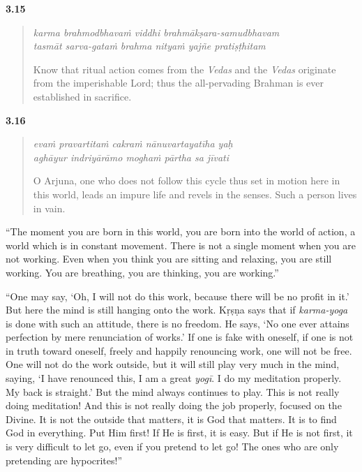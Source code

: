 \par\noindent\textbf{3.15}\par
\begin{verse}
\textit{karma brahmodbhavaṁ viddhi brahmākṣara-samudbhavam} \\
\textit{tasmāt sarva-gataṁ brahma nityaṁ yajñe pratiṣṭhitam}

\noindent Know that ritual action comes from the \textit{Vedas} and the \textit{Vedas} originate from the imperishable Lord; thus the all-pervading Brahman is ever established in sacrifice.
\end{verse}
\par



\par\noindent\textbf{3.16}\par
\begin{verse}
\textit{evaṁ pravartitaṁ cakraṁ nānuvartayatīha yaḥ} \\
\textit{aghāyur indriyārāmo moghaṁ pārtha sa jīvati}

\noindent O Arjuna, one who does not follow this cycle thus set in motion here in this world, leads an impure life and revels in the senses. Such a person lives in vain.
\end{verse}
\par


\enquote{The moment you are born in this world, you are born into the world of action, a world which is in constant movement. There is not a single moment when you are not working. Even when you think you are sitting and relaxing, you are still working. You are breathing, you are thinking, you are working.}

\enquote{One may say, \enquote{Oh, I will not do this work, because there will be no profit in it.} But here the mind is still hanging onto the work. Kṛṣṇa says that if \textit{karma-yoga} is done with such an attitude, there is no freedom. He says, \enquote{No one ever attains perfection by mere renunciation of works.} If one is fake with oneself, if one is not in truth toward oneself, freely and happily renouncing work, one will not be free. One will not do the work outside, but it will still play very much in the mind, saying, \enquote{I have renounced this, I am a great \textit{yogī}. I do my meditation properly. My back is straight.} But the mind always continues to play. This is not really doing meditation! And this is not really doing the job properly, focused on the Divine. It is not the outside that matters, it is God that matters. It is to find God in everything. Put Him first! If He is first, it is easy. But if He is not first, it is very difficult to let go, even if you pretend to let go! The ones who are only pretending are hypocrites!}

